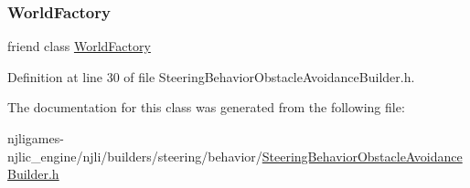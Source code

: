 \subsubsection{\texorpdfstring{World\+Factory}{WorldFactory}}
{\footnotesize\ttfamily friend class \mbox{\hyperlink{classnjli_1_1_world_factory}{World\+Factory}}\hspace{0.3cm}{\ttfamily [friend]}}



Definition at line 30 of file Steering\+Behavior\+Obstacle\+Avoidance\+Builder.\+h.



The documentation for this class was generated from the following file\+:\begin{DoxyCompactItemize}
\item 
njligames-\/njlic\+\_\+engine/njli/builders/steering/behavior/\mbox{\hyperlink{_steering_behavior_obstacle_avoidance_builder_8h}{Steering\+Behavior\+Obstacle\+Avoidance\+Builder.\+h}}\end{DoxyCompactItemize}
